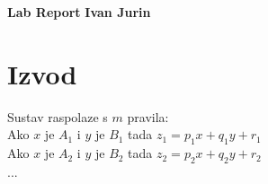\documentclass[a4paper, 11pt]{article}
\begin{document}
\noindent
\large\textbf{Lab Report} \hfill \textbf{Ivan Jurin} \\

\section*{Izvod}
Sustav raspolaze s $m$ pravila:\\

Ako $x$ je $A_{1}$ i $y$ je $B_{1}$ tada $z_{1}=p_{1}x+q_{1}y+r_{1}$\\

Ako $x$ je $A_{2}$ i $y$ je $B_{2}$ tada $z_{2}=p_{2}x+q_{2}y+r_{2}$\\

...\\
\end{document}
